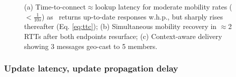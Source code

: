 \begin{figure}[t]
\vspace{-0.2in}
\caption{(a) Time-to-connect$\approx$lookup latency for moderate mobility rates ($<\frac{1}{10s}$)  as \auspice\ returns up-to-date responses w.h.p., but sharply rises thereafter (Eq. \ref{eq:ttc}); (b) Simultaneous mobility recovery in $\approx$2 RTTs after both endpoints resurface; (c) Context-aware delivery showing 3 messages  geo-cast to 5 members.}
\vspace{-0.1in}
\label{fig:end2end}
\end{figure}




\vsp
\subsubsection{Update latency, update propagation delay}
\label{sec:updatelatency}

